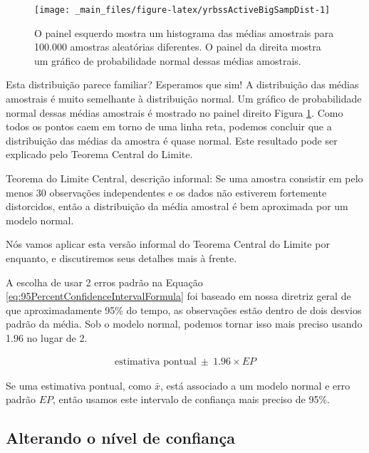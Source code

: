 \documentclass[
]{book}
\theoremstyle{definition}
\theoremstyle{definition}
\theoremstyle{definition}
\theoremstyle{definition}
\theoremstyle{remark}
\begin{document}
\begin{figure}

{\centering \texttt{[image: \_main\_files/figure-latex/yrbssActiveBigSampDist-1]} 

}

\caption{O painel esquerdo mostra um histograma das médias amostrais para 100.000 amostras aleatórias diferentes. O painel da direita mostra um gráfico de probabilidade normal dessas médias amostrais.}\label{fig:yrbssActiveBigSampDist}
\end{figure}

Esta distribuição parece familiar? Esperamos que sim! A distribuição das médias amostrais é muito semelhante à distribuição normal. Um gráfico de probabilidade normal dessas médias amostrais é mostrado no painel direito Figura \ref{fig:yrbssActiveBigSampDist}. Como todos os pontos caem em torno de uma linha reta, podemos concluir que a distribuição das médias da amostra é quase normal. Este resultado pode ser explicado pelo Teorema Central do Limite.

Teorema do Limite Central, descrição informal: Se uma amostra consistir em pelo menos 30 observações independentes e os dados não estiverem fortemente distorcidos, então a distribuição da média amostral é bem aproximada por um modelo normal.

Nós vamos aplicar esta versão informal do Teorema Central do Limite por enquanto, e discutiremos seus detalhes mais à frente.

A escolha de usar 2 erros padrão na Equação \eqref{eq:95PercentConfidenceIntervalFormula} foi baseado em nossa diretriz geral de que aproximadamente 95\% do tempo, as observações estão dentro de dois desvios padrão da média. Sob o modelo normal, podemos tornar isso mais preciso usando 1.96 no lugar de 2.

\begin{eqnarray}
\text{estimativa pontual}\ \pm\ 1.96\times EP
\label{eq:95PercentCIWhenUsingNormalModel}
\end{eqnarray}

Se uma estimativa pontual, como \(\bar{x}\), está associado a um modelo normal e erro padrão \(EP\), então usamos este intervalo de confiança mais preciso de 95\%.

\hypertarget{changingLevelConfidence}{%
\subsection{Alterando o nível de confiança}\label{changingLevelConfidence}}
\end{document}
